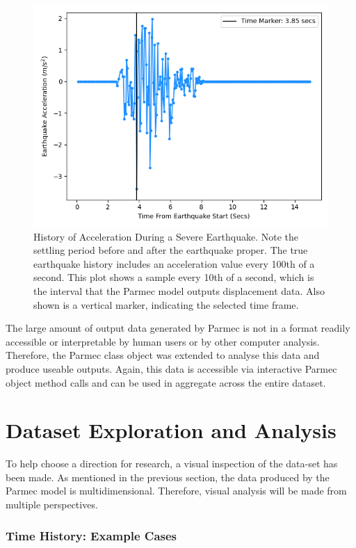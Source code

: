 \begin{figure}[ht]
	\centering
	\includegraphics[scale=0.35]{Figures/earthquake.png}
	\caption{History of Acceleration During a Severe Earthquake. Note the settling period before and after the earthquake proper. The true earthquake history includes an acceleration value every 100th of a second. This plot shows a sample every 10th of a second, which is the interval that the Parmec model outputs displacement data. Also shown is a vertical marker, indicating the selected time frame.}
	\label{fig:earthquake}
\end{figure}

\noindent
The large amount of output data generated by Parmec is not in a format readily accessible or interpretable by human users or by other computer analysis. Therefore, the Parmec class object was extended to analyse this data and produce useable outputs. Again, this data is accessible via interactive Parmec object method calls and can be used in aggregate across the entire dataset.


\section{Dataset Exploration and Analysis}

To help choose a direction for research, a visual inspection of the data-set has been made. As mentioned in the previous section, the data produced by the Parmec model is multidimensional. Therefore, visual analysis will be made from multiple perspectives.

\subsubsection{Time History: Example Cases}


